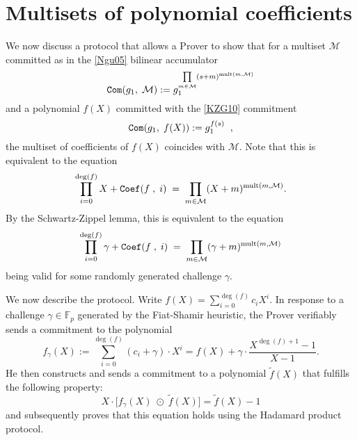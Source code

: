 \documentclass[11pt, lettersize, notitlepage, leqno, footskip=0.6cm]{article}
\newcommand{\bFp}{\mathbb{F}_p}
\newcommand{\wti}{\widetilde}
\newcommand{\mc}{\mathcal}
\newcommand{\mr}{\mathrm}
\newcommand{\vs}{\vspace{-0.15cm}}
\numberwithin{equation}{section}
\begin{document}
\section{\fontsize{11}{11}\selectfont Multisets of polynomial coefficients}

We now discuss a protocol that allows a Prover to show that for a multiset $\mc{M}$ committed as in the \hyperlink{Ngu}{[Ngu05]} bilinear accumulator \vs $$ {\tt{Com}}(g_1,\;\mc{M}):= g_1^{\prod\limits_{m\in\mc{M}} (s+m)^{\mr{mult}(m,\mc{M})}}  $$ and a polynomial $f(X)$ committed with the \hyperlink{KZG}{[KZG10]} commitment \vs $${\tt{Com}}(g_1,\;f(X)):= g_1^{f(s)}\;\;,$$ the multiset of coefficients of $f(X)$ coincides with $\mc{M}$. Note that this is equivalent to the equation \vs $$ \prod\limits_{i=0}^{\deg(f)} X+{\tt{Coef}}(f\;,\;i)  \; = \;   \prod\limits_{m\in\mc{M}}  (X+m)^{\mr{mult}(m,\mc{M})}. $$ By the Schwartz-Zippel lemma, this is equivalent to the equation \vs $$ \prod\limits_{i=0}^{\deg(f)} \gamma+{\tt{Coef}}(f\;,\; i)  \; = \;   \prod\limits_{m\in\mc{M}}  (\gamma+m)^{\mr{mult}(m,\mc{M})} $$ being valid for some randomly generated challenge $\gamma$.


We now describe the protocol. Write $f(X) = \sum\limits_{i=0}^{\deg(f)} c_iX^i$. In response to a challenge $\gamma\in \bFp$ generated by the Fiat-Shamir heuristic, the Prover verifiably sends a commitment to the polynomial \vs $$f_{\gamma}(X):= \sum\limits_{i=0}^{\deg(f)} (c_i+\gamma)\cdot X^i = f(X) + \gamma\cdot \frac{X^{\deg(f)+1}-1}{X-1} . $$ He then constructs and sends a commitment to a polynomial $\wti{f}(X)$ that fulfills the following property: $$ X\cdot \big[f_{\gamma}(X) \;\odot\; \wti{f}(X) \big]  = \wti{f}(X) - 1  $$ and subsequently proves that this equation holds using the Hadamard product protocol.

\begin{comment}

We now describe the protocol. Write $f(X) = \sum\limits_{i=0}^{\deg(f)} c_iX^i$. In response to a challenge $\gamma\in \bFp$ generated by the Fiat-Shamir heuristic, the Prover verifiably sends a commitment to the polynomial \vs $$f_{\gamma}(X):= \sum\limits_{i=0}^{\deg(f)+1} (c_i+\gamma)\cdot X^i = f(X) + \gamma\cdot \frac{X^{|{\tt{CRS}}|}-1}{X-1} . $$ He then constructs and sends a commitment to a polynomial $\wti{f}(X)$ that fulfills the following property: $$ X\cdot \big[f_{\gamma}(X) \;\odot\; \wti{f}(X) \big]  = \wti{f}(X) - 1  $$ and subsequently proves that this equation holds using the Hadamard product protocol.

\end{comment}
\end{document}
